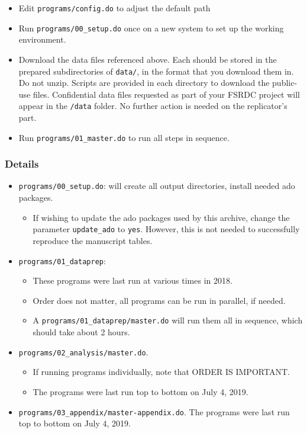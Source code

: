 \documentclass[
]{article}
\providecommand{\tightlist}{%
  \setlength{\itemsep}{0pt}\setlength{\parskip}{0pt}}
\begin{document}
\begin{itemize}
\tightlist
\item
  Edit \texttt{programs/config.do} to adjust the default path
\item
  Run \texttt{programs/00\_setup.do} once on a new system to set up the
  working environment.
\item
  Download the data files referenced above. Each should be stored in the
  prepared subdirectories of \texttt{data/}, in the format that you
  download them in. Do not unzip. Scripts are provided in each directory
  to download the public-use files. Confidential data files requested as
  part of your FSRDC project will appear in the \texttt{/data} folder.
  No further action is needed on the replicator's part.
\item
  Run \texttt{programs/01\_master.do} to run all steps in sequence.
\end{itemize}

\hypertarget{details}{%
\subsubsection{Details}\label{details}}

\begin{itemize}
\tightlist
\item
  \texttt{programs/00\_setup.do}: will create all output directories,
  install needed ado packages.

  \begin{itemize}
  \tightlist
  \item
    If wishing to update the ado packages used by this archive, change
    the parameter \texttt{update\_ado} to \texttt{yes}. However, this is
    not needed to successfully reproduce the manuscript tables.
  \end{itemize}
\item
  \texttt{programs/01\_dataprep}:

  \begin{itemize}
  \tightlist
  \item
    These programs were last run at various times in 2018.
  \item
    Order does not matter, all programs can be run in parallel, if
    needed.
  \item
    A \texttt{programs/01\_dataprep/master.do} will run them all in
    sequence, which should take about 2 hours.
  \end{itemize}
\item
  \texttt{programs/02\_analysis/master.do}.

  \begin{itemize}
  \tightlist
  \item
    If running programs individually, note that ORDER IS IMPORTANT.
  \item
    The programs were last run top to bottom on July 4, 2019.
  \end{itemize}
\item
  \texttt{programs/03\_appendix/master-appendix.do}. The programs were
  last run top to bottom on July 4, 2019.
\end{itemize}
\end{document}
